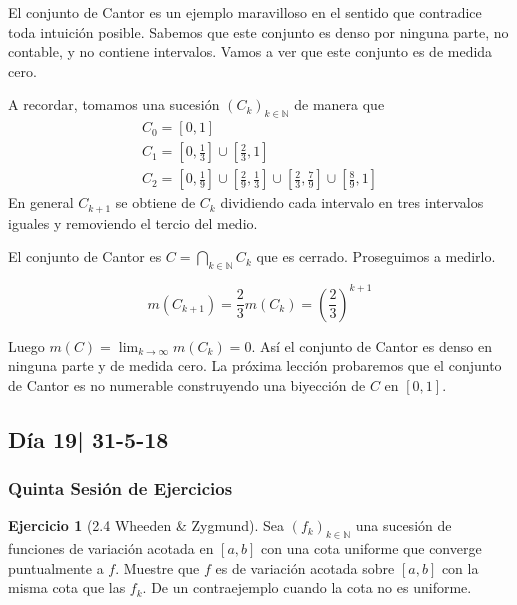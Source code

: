 \documentclass[12pt]{article}
\theoremstyle{plain}
\theoremstyle{definition}
\newtheorem{Ej}[Th]{Ejercicio}
\theoremstyle{remark}
\numberwithin{equation}{section}
\newcommand{\bN}{\mathbb{N}}        %
\renewcommand{\:}{\colon}           %
\newcommand{\bonj}[1]{\left\lbrack#1\right\rbrack}
\begin{document}
\begin{multicols}{2}
El conjunto de Cantor es un ejemplo maravilloso en el sentido que contradice toda intuición posible. Sabemos que este conjunto es denso por ninguna parte, no contable, y no contiene intervalos. Vamos a ver que este conjunto es de medida cero.\par
A recordar, tomamos una sucesión $(C_k)_{k\in\bN}$ de manera que
\begin{gather*}
  C_0=\bonj{0,1}\\
  C_1=\bonj{0,\frac{1}{3}}\cup\bonj{\frac{2}{3},1}\\
  C_2=\bonj{0,\frac{1}{9}}\cup\bonj{\frac{2}{9},\frac{1}{3}}\cup\bonj{\frac{2}{3},\frac{7}{9}}\cup\bonj{\frac{8}{9},1}
\end{gather*}
En general $C_{k+1}$ se obtiene de $C_k$ dividiendo cada intervalo en tres intervalos iguales y removiendo el tercio del medio.\par
El conjunto de Cantor es $C=\bigcap_{k\in\bN}C_k$ que es cerrado. Proseguimos a medirlo.

 $$m(C_{k+1}) =\frac{2}{3}m(C_k)=\left(\frac{2}{3}\right)^{k+1}$$

Luego $m(C)=\lim_{k\to\infty}m(C_k)=0$. Así el conjunto de Cantor es denso en ninguna parte y de medida cero. La próxima lección probaremos que el conjunto de Cantor es no numerable construyendo una biyección de $C$ en $\bonj{0,1}$.


\subsection{Día 19| 31-5-18}

\subsubsection*{Quinta Sesión de Ejercicios}

\begin{Ej}[2.4 Wheeden \& Zygmund]
  Sea $(f_k)_{k\in\bN}$ una sucesión de funciones de variación acotada en $\bonj{a,b}$ con una cota uniforme que converge puntualmente a $f$. Muestre que $f$ es de variación acotada sobre $\bonj{a,b}$ con la misma cota que las $f_k$. De un contraejemplo cuando la cota no es uniforme.
\end{Ej}


\end{multicols}
\end{document}
